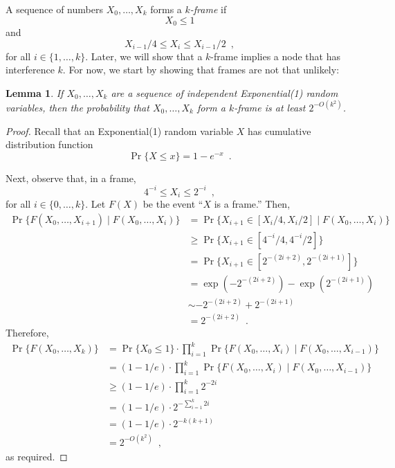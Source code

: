 \documentclass{article}
\newtheorem{lem}{Lemma}
\begin{document}
A sequence of numbers $X_0,\ldots,X_k$ forms a \emph{$k$-frame} if
\[
     X_0 \le 1
\]
and
\[
     X_{i-1}/4 \le X_i \le X_{i-1}/2 \enspace ,
\]
for all $i\in\{1,\ldots,k\}$.  Later, we will show that a $k$-frame implies a
node that has interference $k$.  For now, we start by showing that frames
are not that unlikely:

\begin{lem}
If $X_0,\ldots,X_k$ are a sequence of independent Exponential(1) random
variables, then the probability that $X_0,\ldots,X_k$ form a $k$-frame is
at least $2^{-O(k^2)}$.
\end{lem}

\begin{proof}
Recall that an Exponential(1) random variable $X$ has cumulative
distribution function
\[
   \Pr\{X \le x\} = 1-e^{-x} \enspace .
\]

Next, observe that, in a frame,
\[
                 4^{-i} \le X_i \le 2^{-i}  \enspace ,
\]
for all $i\in\{0,\ldots,k\}$.  Let $F(X)$ be the event ``$X$ is a frame.''
Then,
\begin{align*}
     \Pr\{F(X_0,\ldots,X_{i+1}) \mid F(X_0,\ldots,X_{i})\} 
        & = \Pr\{X_{i+1} \in [X_{i}/4,X_{i}/2] \mid F(X_0,\ldots,X_{i})\} \\
        & \ge \Pr\{X_{i+1} \in [4^{-i}/4,4^{-i}/2]\} \\
        & = \Pr\{X_{i+1} \in [2^{-(2i+2)},2^{-(2i+1)}]\} \\
        & = \exp(-2^{-(2i+2)}) - \exp(2^{-(2i+1)}) \\
        & \sim -2^{-(2i+2)} + 2^{-(2i+1)} \\
        & = 2^{-(2i+2)} \enspace .
\end{align*}
Therefore,
\begin{align*}
     \Pr\{F(X_0,\ldots,X_{k})\}
   & = \Pr\{X_0\le 1\}
         \cdot\prod_{i=1}^k \Pr\{F(X_0,\ldots,X_{i})
                                 \mid F(X_0,\ldots,X_{i-1})\} \\
   & = (1-1/e)
         \cdot\prod_{i=1}^k \Pr\{F(X_0,\ldots,X_{i})
                                 \mid F(X_0,\ldots,X_{i-1})\} \\
   & \ge (1-1/e)\cdot\prod_{i=1}^k 2^{-2i} \\
   & = (1-1/e)\cdot2^{-\sum_{i=1}^k 2i} \\
   & = (1-1/e)\cdot2^{-k(k+1)} \\
   & = 2^{-O(k^2)} \enspace ,
\end{align*}
as required.
\end{proof}
\end{document}
